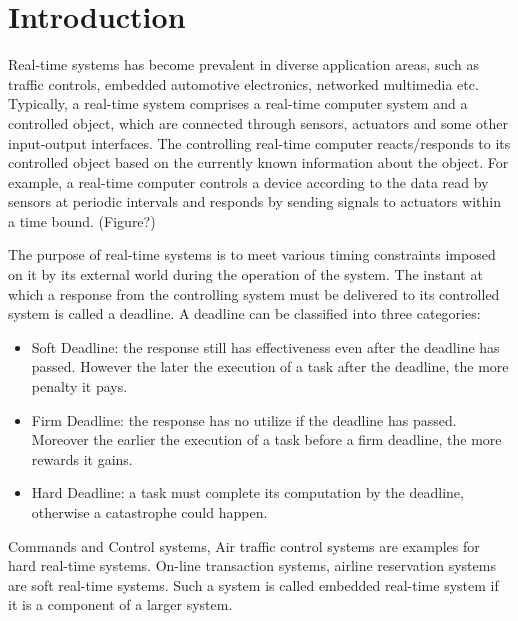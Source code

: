 \documentclass[preprint,12pt]{elsarticle}
\begin{document}

\section{Introduction} \label{S:1}

Real-time systems has become prevalent in diverse application areas, such as traffic controls, embedded automotive electronics, networked multimedia etc. Typically, a real-time system comprises a real-time computer system and a controlled object, which are connected through sensors, actuators and some other input-output interfaces. The controlling real-time computer reacts/responds to its controlled object based on the currently known information about the object. For example, a real-time computer controls a device according to the data read by sensors at periodic intervals and responds by sending signals to actuators within a time bound. (Figure?)

The purpose of real-time systems is to meet various timing constraints imposed on it by its external world during the operation of the system.
The instant at which a response from the controlling system must be delivered to its controlled system is called a deadline. A deadline can be classified into three categories\cite{mohammadi2005scheduling}:

\begin{itemize}
\item Soft Deadline: the response still has effectiveness even after the deadline has passed. However the later the execution of a task after the deadline, the more penalty it pays.
\item Firm Deadline: the response has no utilize if the deadline has passed. Moreover the earlier the execution of a task before a firm deadline, the more rewards it gains.

\item Hard Deadline: a task must complete its computation by the deadline, otherwise a catastrophe could happen.

\end{itemize}

Commands and Control systems, Air traffic control systems are examples for hard real-time systems. On-line transaction systems, airline reservation systems are soft real-time systems\cite{davis2011survey}. Such a system is called embedded real-time system if it is a component of a larger system.
\end{document}
